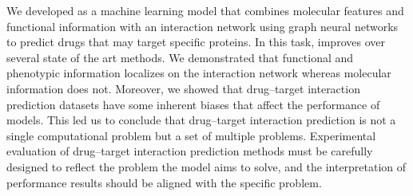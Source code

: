 \documentclass{bioinfo}
\begin{document}
We developed \name{} as a machine learning model that combines
molecular features and functional information with an interaction
network using graph neural networks to predict drugs that may target
specific proteins. In this task, \name{} improves over several state
of the art methods. We demonstrated that functional and phenotypic
information localizes on the interaction network whereas molecular
information does not. Moreover, we showed that drug--target
interaction prediction datasets have some inherent biases that affect
the performance of models. This led us to conclude that drug--target
interaction prediction is not a single computational problem but a set
of multiple problems. Experimental evaluation of drug--target
interaction prediction methods must be carefully designed to reflect
the problem the model aims to solve, and the interpretation of
performance results should be aligned with the specific problem.




	
	
\end{document}
